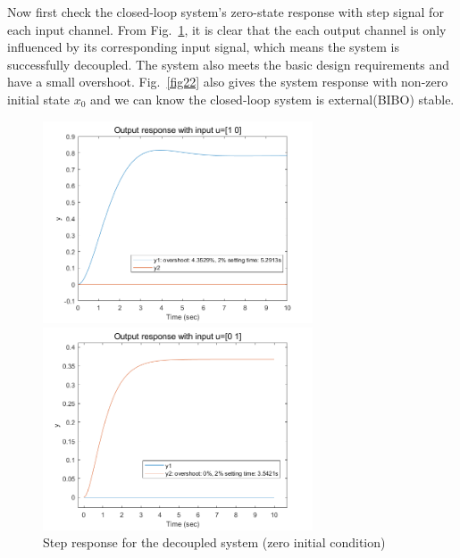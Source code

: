 \documentclass[hyperref]{article}
\theoremstyle{nonumberplain}
\begin{document}
	Now first check the closed-loop system's zero-state response with step signal for each input channel. From Fig.~\ref{fig21}, it is clear that the each output channel is only influenced by its corresponding input signal, which means the system is successfully decoupled. The system also meets the basic design requirements and have a small overshoot. Fig.~\ref{fig22} also gives the system response with non-zero initial state $x_{0}$ and we can know the closed-loop system is external(BIBO) stable. 
	
	\begin{figure}[H]
		\centering
		\begin{minipage}[t]{0.48\textwidth}
			\centering
			\includegraphics[width=8cm]{fig30.png}
		\end{minipage}
		\begin{minipage}[t]{0.48\textwidth}
			\centering
			\includegraphics[width=8cm]{fig31.png}
		\end{minipage}
		\caption{Step response for the decoupled system (zero initial condition)}
		\label{fig21}
	\end{figure}
	
\end{document}
